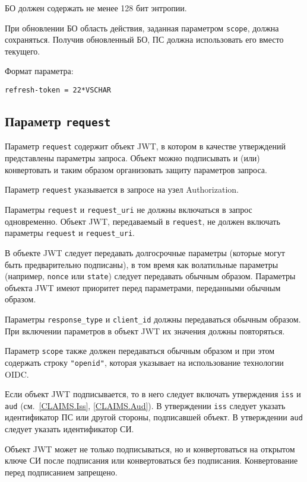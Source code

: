 БО должен содержать не менее 128 бит энтропии.

При обновлении БО область действия, заданная параметром \lstinline{scope}, 
должна сохраняться.
%
Получив обновленный БО, ПС должна использовать его вместо текущего.

Формат параметра:
\begin{lstlisting}
refresh-token = 22*VSCHAR
\end{lstlisting}

\subsection{Параметр \lstinline{request}}\label{PARAMS.Request} 

Параметр \lstinline{request} содержит объект JWT, в котором в качестве утверждений
представлены параметры запроса. Объект можно подписывать и (или) 
конвертовать и таким образом организовать защиту параметров запроса.

Параметр \lstinline{request} указывается в запросе на узел Authorization.

Параметры \lstinline{request} и \lstinline{request_uri} не должны включаться в 
запрос одновременно. 
%
Объект JWT, передаваемый в \lstinline{request}, не должен включать 
параметры \lstinline{request} и \lstinline{request_uri}.

В объекте JWT следует передавать долгосрочные параметры (которые могут быть 
предварительно подписаны), в том время как волатильные параметры (например,
\lstinline{nonce} или \lstinline{state}) следует передавать обычным образом. 
%
Параметры объекта JWT имеют приоритет перед параметрами, переданными обычным 
образом.

Параметры \lstinline{response_type} и \lstinline{client_id} должны передаваться
обычным образом. При включении параметров в объект JWT их значения должны
повторяться.

Параметр \lstinline{scope} также должен передаваться обычным образом и при 
этом содержать строку \lstinline{"openid"}, которая указывает на использование 
технологии OIDC.

Если объект JWT подписывается, то в него следует включать утверждения 
\lstinline{iss} и \lstinline{aud} (см.~\ref{CLAIMS.Iss}, \ref{CLAIMS.Aud}).
%
В утверждении \lstinline{iss} следует указать идентификатор ПС или другой 
стороны, подписавшей объект.
%
В утверждении \lstinline{aud} следует указать идентификатор СИ.

Объект JWT может не только подписываться, но и конвертоваться на открытом ключе 
СИ после подписания или конвертоваться без подписания. Конвертование перед 
подписанием запрещено.

